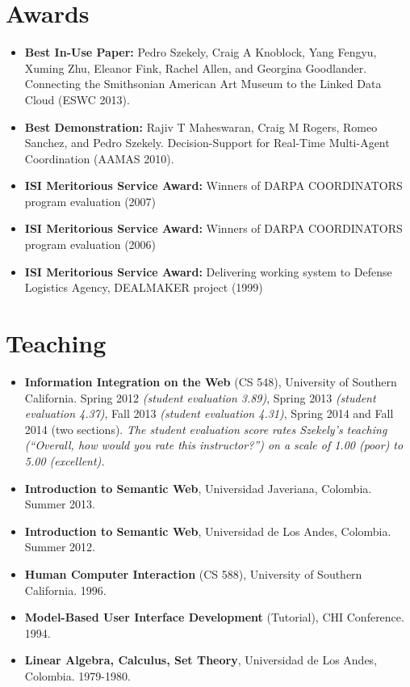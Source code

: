 \documentclass{article}
\begin{document}
\section*{Awards}
\begin{itemize}
	\item {\bf Best In-Use Paper: } 
	Pedro Szekely, Craig A Knoblock, Yang Fengyu, Xuming Zhu, Eleanor Fink, Rachel Allen, and Georgina Goodlander. Connecting the Smithsonian American Art Museum to the Linked Data Cloud 
	(ESWC 2013).
  
	\item {\bf Best Demonstration: }
	Rajiv T Maheswaran, Craig M Rogers, Romeo Sanchez, and Pedro Szekely. Decision-Support for Real-Time Multi-Agent Coordination (AAMAS 2010).
  
	\item {\bf ISI Meritorious Service Award: } Winners of DARPA COORDINATORS program evaluation (2007)

	\item {\bf ISI Meritorious Service Award: } Winners of DARPA COORDINATORS program evaluation (2006)
        
	\item {\bf ISI Meritorious Service Award: } Delivering working system to Defense Logistics Agency, DEALMAKER project (1999)
\end{itemize}


\section*{Teaching}
\begin{itemize}
  \item {\bf Information Integration on the Web} (CS 548), University of Southern California.
   Spring 2012 {\em (student evaluation 3.89)},  
   Spring 2013 {\em (student evaluation 4.37)}, 
   Fall 2013 {\em (student evaluation 4.31)}, 
   Spring 2014 and 
   Fall 2014 (two sections).
    {\em The student evaluation score rates Szekely's teaching (``Overall, how would you rate this instructor?'') on a scale of 1.00 (poor) to 5.00 (excellent).}
   
  \item {\bf Introduction to Semantic Web}, Universidad Javeriana, Colombia. Summer 2013. 
  
  \item {\bf Introduction to Semantic Web}, Universidad de Los Andes, Colombia. Summer 2012. 
  
  \item {\bf Human Computer Interaction} (CS 588), University of Southern California. 1996.
  
 \item {\bf Model-Based User Interface Development} (Tutorial), CHI Conference.  1994.
    
  \item {\bf Linear Algebra, Calculus, Set Theory}, Universidad de Los Andes, Colombia. 1979-1980.
  
\end{itemize}
\end{document}
